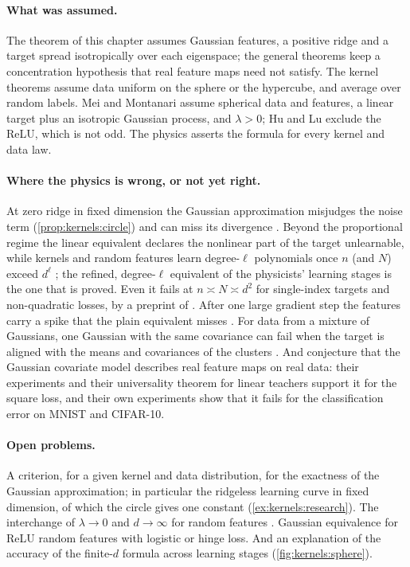 \begin{refsection}
\paragraph{What was assumed.} The theorem of this chapter assumes Gaussian features, a positive ridge and a target spread isotropically over each eigenspace; the general theorems keep a concentration hypothesis that real feature maps need not satisfy. The kernel theorems assume data uniform on the sphere or the hypercube, and \textcite{XiaoEtAl2023} average over random labels. Mei and Montanari assume spherical data and features, a linear target plus an isotropic Gaussian process, and $\lambda>0$; Hu and Lu exclude the ReLU, which is not odd. The physics asserts the formula for every kernel and data law.

\paragraph{Where the physics is wrong, or not yet right.} At zero ridge in fixed dimension the Gaussian approximation misjudges the noise term (\cref{prop:kernels:circle}) and can miss its divergence \parencite{ChengEtAl2024b}. Beyond the proportional regime the linear equivalent declares the nonlinear part of the target unlearnable, while kernels and random features learn degree-$\ell$ polynomials once $n$ (and $N$) exceed $d^\ell$ \parencite{GhorbaniEtAl2021,MeiMisiakiewiczMontanari2022}; the refined, degree-$\ell$ equivalent of the physicists' learning stages is the one that is proved. Even it fails at $n\asymp N\asymp d^2$ for single-index targets and non-quadratic losses, by a preprint of \textcite{WenEtAl2025}. After one large gradient step the features carry a spike that the plain equivalent misses \parencite{BaEtAl2022}. For data from a mixture of Gaussians, one Gaussian with the same covariance can fail when the target is aligned with the means and covariances of the clusters \parencite{PesceEtAl2023}. And \textcite{LoureiroEtAl2022} conjecture that the Gaussian covariate model describes real feature maps on real data: their experiments and their universality theorem for linear teachers support it for the square loss, and their own experiments show that it fails for the classification error on MNIST and CIFAR-10.

\paragraph{Open problems.} A criterion, for a given kernel and data distribution, for the exactness of the Gaussian approximation; in particular the ridgeless learning curve in fixed dimension, of which the circle gives one constant (\cref{ex:kernels:research}). The interchange of $\lambda\to0$ and $d\to\infty$ for random features \parencite[Remark~1]{MeiMontanari2022}. Gaussian equivalence for ReLU random features with logistic or hinge loss. And an explanation of the accuracy of the finite-$d$ formula across learning stages (\cref{fig:kernels:sphere}).


\end{refsection}
